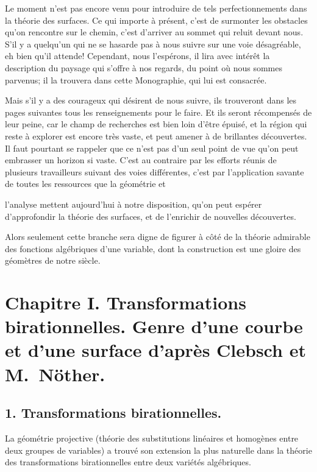 \documentclass{article}
\begin{document}
Le moment n'est pas encore venu pour introduire de tels perfectionnements dans la théorie des surfaces. Ce qui importe à présent, c'est de surmonter les obstacles qu'on rencontre sur le chemin, c'est d'arriver au sommet qui reluit devant nous. S'il y a quelqu'un qui ne se hasarde pas à nous suivre sur une voie désagréable, eh bien qu'il attende! Cependant, nous l'espérons, il lira avec intérêt la description du paysage qui s'offre à nos regards, du point où nous sommes parvenus; il la trouvera dans cette Monographie, qui lui est consacrée.

Mais s'il y a des courageux qui désirent de nous suivre, ils trouveront dans les pages suivantes tous les renseignements pour le faire. Et ils seront récompensés de leur peine, car le champ de recherches est bien loin d'être épuisé, et la région qui reste à explorer est encore très vaste, et peut amener à de brillantes découvertes. Il faut pourtant se rappeler que ce n'est pas d'un seul point de vue qu'on peut embrasser un horizon si vaste. C'est au contraire par les efforts réunis de plusieurs travailleurs suivant des voies différentes, c'est par l'application savante de toutes les ressources que la géométrie et

l'analyse mettent aujourd'hui à notre disposition, qu'on peut espérer d'approfondir la théorie des surfaces, et de l'enrichir de nouvelles découvertes.

Alors seulement cette branche sera digne de figurer à côté de la théorie admirable des fonctions algébriques d'une variable, dont la construction est une gloire des géomètres de notre siècle.

\section*{Chapitre I. Transformations birationnelles. Genre d'une courbe et d'une surface d'après Clebsch et M.\ Nöther.}

\subsection*{1. Transformations birationnelles.}

La géométrie projective (théorie des substitutions linéaires et homogènes entre deux groupes de variables) a trouvé son extension la plus naturelle dans la théorie des transformations birationnelles entre deux variétés algébriques.
\end{document}
